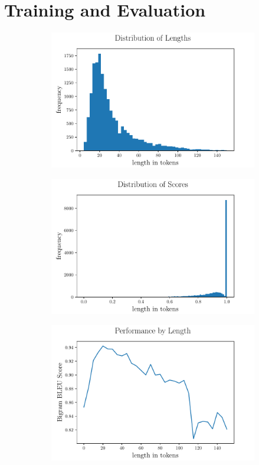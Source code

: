 \documentclass{article}
\begin{document}
\section{Training and Evaluation}

\begin{figure}[h]
  \begin{subfigure}{0.5\textwidth}
		\includegraphics[scale=.425]{histogram.pdf}
		\centering
		\caption{}
	\end{subfigure}
	\begin{subfigure}{0.5\textwidth}
		\includegraphics[scale=.425]{scorehistogram.pdf}
		\centering
		\caption{}
	\end{subfigure}
  \begin{subfigure}{1.0\textwidth}
		\centering
		\includegraphics[scale=.425]{scorebylen.pdf}

\end{subfigure}
\end{figure}
\end{document}
